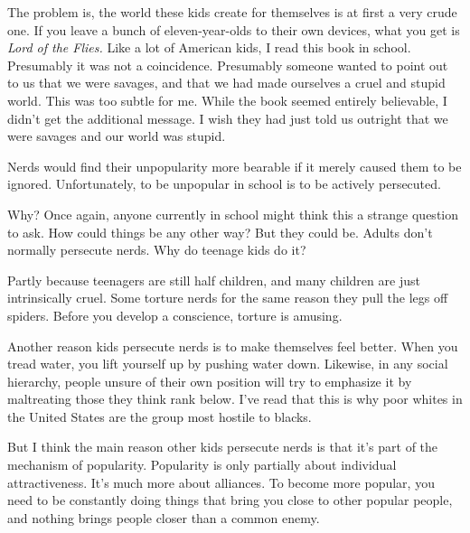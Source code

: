 The problem is, the world these kids
                  create for themselves is at first a very crude one. If you
                  leave a bunch of eleven-year-olds to their own devices, what
                  you get is \emph{Lord of the Flies.} Like a lot of American
                  kids, I read this book in school. Presumably it was not a
                  coincidence. Presumably someone wanted to point out to us that
                  we were savages, and that we had made ourselves a cruel and
                  stupid world. This was too subtle for me. While the book
                  seemed entirely believable, I didn't get the additional
                  message. I wish they had just told us outright that we were
                  savages and our world was stupid.




                  Nerds would find their unpopularity more bearable if it merely
                  caused them to be ignored. Unfortunately, to be unpopular in
                  school is to be actively persecuted.

Why? Once
                  again, anyone currently in school might think this a strange
                  question to ask. How could things be any other way? But they
                  could be. Adults don't normally persecute nerds. Why do
                  teenage kids do it?

Partly because teenagers are
                  still half children, and many children are just intrinsically
                  cruel. Some torture nerds for the same reason they pull the
                  legs off spiders. Before you develop a conscience, torture is
                  amusing.

Another reason kids persecute nerds is to
                  make themselves feel better. When you tread water, you lift
                  yourself up by pushing water down. Likewise, in any social
                  hierarchy, people unsure of their own position will try to
                  emphasize it by maltreating those they think rank below. I've
                  read that this is why poor whites in the United States are the
                  group most hostile to blacks.

But I think the main
                  reason other kids persecute nerds is that it's part of the
                  mechanism of popularity. Popularity is only partially about
                  individual attractiveness. It's much more about alliances. To
                  become more popular, you need to be constantly doing things
                  that bring you close to other popular people, and nothing
                  brings people closer than a common enemy.

